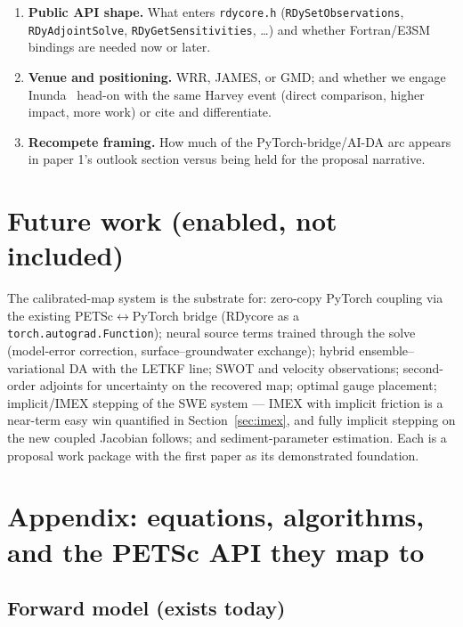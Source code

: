 \documentclass[11pt]{article}
\begin{document}
\begin{enumerate}[nosep]
        the compelling demo but exercises wetting/drying; validation
        cases stay fully wet. How wet is the calibration window we pick?
  \item \textbf{Public API shape.} What enters \texttt{rdycore.h}
        (\texttt{RDySetObservations}, \texttt{RDyAdjointSolve},
        \texttt{RDyGetSensitivities}, \ldots) and whether Fortran/E3SM
        bindings are needed now or later.
  \item \textbf{Venue and positioning.} WRR, JAMES, or GMD; and whether we
        engage Inunda~\cite{li2026inunda} head-on with the same Harvey
        event (direct comparison, higher impact, more work) or cite and
        differentiate.
  \item \textbf{Recompete framing.} How much of the PyTorch-bridge/AI-DA
        arc appears in paper 1's outlook section versus being held for the
        proposal narrative.
\end{enumerate}

\section{Future work (enabled, not included)}
\label{sec:future}

The calibrated-map system is the substrate for: zero-copy PyTorch coupling
via the existing PETSc$\leftrightarrow$PyTorch bridge (RDycore as a
\texttt{torch.autograd.Function}); neural source terms trained through the
solve (model-error correction, surface--groundwater exchange); hybrid
ensemble--variational DA with the LETKF line; SWOT and velocity
observations; second-order adjoints for uncertainty on the recovered map;
optimal gauge placement; implicit/IMEX stepping of the SWE system ---
IMEX with implicit friction is a near-term easy win quantified in
Section~\ref{sec:imex}, and fully implicit stepping on the new coupled
Jacobian follows; and sediment-parameter estimation. Each is a proposal work package with the
first paper as its demonstrated foundation.

\section{Appendix: equations, algorithms, and the PETSc API they map to}
\label{sec:math}

\subsection*{Forward model (exists today)}
\end{document}

